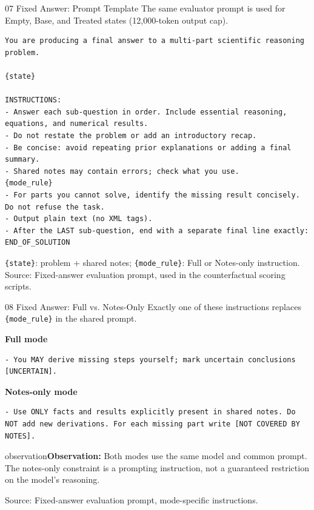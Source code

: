 \documentclass[aspectratio=169,10pt]{beamer}
\newcommand{\observation}[1]{\vspace{2mm}\begin{beamercolorbox}[rounded=true,sep=1ex,wd=\textwidth]{observation}\small\textbf{Observation:} #1\end{beamercolorbox}}
\newcommand{\source}[1]{\vfill{\tiny\textcolor{muted}{Source: #1}}}
\begin{document}
\begin{frame}[fragile]{07 \quad Fixed Answer: Prompt Template}
\small\textcolor{muted}{The same evaluator prompt is used for Empty, Base, and Treated states (12,000-token output cap).}
\begin{lstlisting}[basicstyle=\ttfamily\fontsize{8.0}{9.6}\selectfont]
You are producing a final answer to a multi-part scientific reasoning problem.

{state}

INSTRUCTIONS:
- Answer each sub-question in order. Include essential reasoning, equations, and numerical results.
- Do not restate the problem or add an introductory recap.
- Be concise: avoid repeating prior explanations or adding a final summary.
- Shared notes may contain errors; check what you use.
{mode_rule}
- For parts you cannot solve, identify the missing result concisely. Do not refuse the task.
- Output plain text (no XML tags).
- After the LAST sub-question, end with a separate final line exactly:
END_OF_SOLUTION
\end{lstlisting}
\vspace{2mm}\small\textcolor{muted}{\texttt{\{state\}}: problem + shared notes; \texttt{\{mode\_rule\}}: Full or Notes-only instruction.}
\source{Fixed-answer evaluation prompt, used in the counterfactual scoring scripts.}
\end{frame}

\begin{frame}[fragile]{08 \quad Fixed Answer: Full vs. Notes-Only}
\small\textcolor{muted}{Exactly one of these instructions replaces \texttt{\{mode\_rule\}} in the shared prompt.}
\par\vspace{3mm}
\textbf{Full mode}
\begin{lstlisting}[basicstyle=\ttfamily\fontsize{8.3}{10.4}\selectfont]
- You MAY derive missing steps yourself; mark uncertain conclusions [UNCERTAIN].
\end{lstlisting}
\vspace{6mm}
\textbf{Notes-only mode}
\begin{lstlisting}[basicstyle=\ttfamily\fontsize{8.3}{10.4}\selectfont]
- Use ONLY facts and results explicitly present in shared notes. Do NOT add new derivations. For each missing part write [NOT COVERED BY NOTES].
\end{lstlisting}
\vspace{7mm}
\observation{Both modes use the same model and common prompt. The notes-only constraint is a prompting instruction, not a guaranteed restriction on the model's reasoning.}
\source{Fixed-answer evaluation prompt, mode-specific instructions.}
\end{frame}
\end{document}
